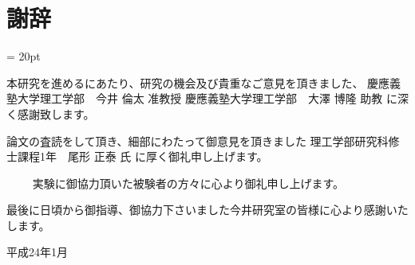 %
%
\chapter*{謝辞}
\baselineskip = 20pt


\begin{verbatimtab}
	本研究を進めるにあたり、研究の機会及び貴重なご意見を頂きました、
			慶應義塾大学理工学部　今井 倫太 准教授
			慶應義塾大学理工学部　大澤 博隆 助教
に深く感謝致します。


	論文の査読をして頂き、細部にわたって御意見を頂きました
			理工学部研究科修士課程1年　尾形 正泰 氏
に厚く御礼申し上げます。

　　
	実験に御協力頂いた被験者の方々に心より御礼申し上げます。



最後に日頃から御指導、御協力下さいました今井研究室の皆様に心より感謝いたします。


							平成24年1月
\end{verbatimtab}